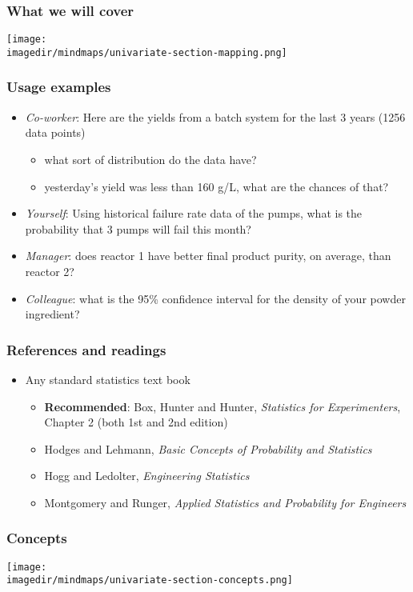 \begin{frame}\frametitle{What we will cover}
	\texttt{[image: \\imagedir/mindmaps/univariate-section-mapping.png]}
\end{frame}

\begin{frame}\frametitle{Usage examples}
	\begin{itemize}
		\item \emph{Co-worker}: Here are the yields from a batch system for the last 3 years (1256 data points)
		\begin{itemize}
			\item what sort of distribution do the data have?
			\item yesterday's yield was less than 160 g/L, what are the chances of that?
		\end{itemize}
		\item \emph{Yourself}: Using historical failure rate data of the pumps, what is the probability that 3 pumps will fail this month?
		\item \emph{Manager}: does reactor 1 have better final product purity, on average, than reactor 2?
		\item \emph{Colleague}: what is the 95\% confidence interval for the density of your powder ingredient?
	\end{itemize}
\end{frame}

\begin{frame}\frametitle{References and readings}
	\begin{itemize}
		\item Any standard statistics text book
		\begin{itemize}
			\item \textbf{Recommended}: Box, Hunter and Hunter, \emph{Statistics for Experimenters}, Chapter 2 (both 1st and 2nd edition)
			\item Hodges and Lehmann, \emph{Basic Concepts of Probability and Statistics}
			\item Hogg and Ledolter, \emph{Engineering Statistics}
			\item Montgomery and Runger, \emph{Applied Statistics and Probability for Engineers}
		\end{itemize}
	\end{itemize}
\end{frame}

\begin{frame}\frametitle{Concepts}
	\begin{center}
		\texttt{[image: \\imagedir/mindmaps/univariate-section-concepts.png]}
	\end{center}
\end{frame}

